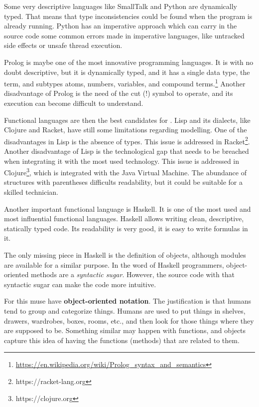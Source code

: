 Some very descriptive languages like SmallTalk and Python are dynamically typed.
That means that type inconsistencies could be found when the program is already running.
Python has an imperative approach which can carry in the source code some common errors made in imperative languages, like untracked side effects or unsafe thread execution.

Prolog is maybe one of the most innovative programming languages.
It is with no doubt descriptive, but it is dynamically typed, and it has a single data type, the term, and subtypes atoms, numbers, variables, and compound terms.\footnote{\url{https://en.wikipedia.org/wiki/Prolog_syntax_and_semantics}}
Another disadvantage of Prolog is the need of the cut (!) symbol to operate, and its execution can become difficult to understand.

Functional languages are then the best candidates for \Soda.
Lisp and its dialects, like Clojure and Racket, have still some limitations regarding modelling.
One of the disadvantages in Lisp is the absence of types.
This issue is addressed in Racket\footnote{https://racket-lang.org}.
Another disadvantage of Lisp is the technological gap that needs to be breached when integrating it with the most used technology.
This issue is addressed in Clojure\footnote{https://clojure.org}, which is integrated with the Java Virtual Machine.
The abundance of structures with parentheses difficults readability, but it could be suitable for a skilled technician.

Another important functional language is Haskell.
It is one of the most used and most influential functional languages.
Haskell allows writing clean, descriptive, statically typed code.
Its readability is very good, it is easy to write formulas in it.

The only missing piece in Haskell is the definition of objects, although modules are available for a similar purpose.
In the word of Haskell programmers, object-oriented methods are a \textit{syntactic sugar}.
However, the source code with that syntactic sugar can make the code more intuitive.

For this \Soda muse have \textbf{object-oriented notation}.
The justification is that humans tend to group and categorize things.
Humans are used to put things in shelves, drawers, wardrobes, boxes, rooms, etc., and then look for those things where they are supposed to be.
Something similar may happen with functions, and objects capture this idea of having the functions (methods) that are related to them.

